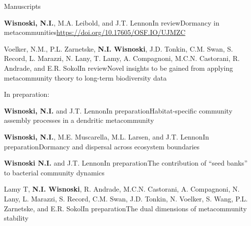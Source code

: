 \documentclass{resume} %
\begin{document}
\bigskip
\newpage

\begin{rhangSection}{Manuscripts}

\begin{Prep}{{\bf Wisnoski, N.I.}, M.A. Leibold, and J.T. Lennon}{In review}{Dormancy in metacommunities}{\url{https://doi.org/10.17605/OSF.IO/UJMZC}}
\end{Prep}

\begin{Prep}{Voelker, N.M., P.L. Zarnetske, {\bf N.I. Wisnoski}, J.D. Tonkin, C.M. Swan, S. Record, L. Marazzi, N. Lany, T. Lamy, A. Compagnoni, M.C.N. Castorani, R. Andrade, and E.R. Sokol}{In review}{Novel insights to be gained from applying metacommunity theory to long-term biodiversity data}{}
\end{Prep}

\smallskip
{ In preparation:}

\begin{Prep}{{\bf Wisnoski, N.I.} and J.T. Lennon}{In preparation}{Habitat-specific community assembly processes in a dendritic metacommunity}{}
\end{Prep}

\begin{Prep}{{\bf Wisnoski, N.I.}, M.E. Muscarella, M.L. Larsen, and J.T. Lennon}{In preparation}{Dormancy and dispersal across ecosystem boundaries}{}
\end{Prep}

\begin{Prep}{{\bf Wisnoski N.I.} and J.T. Lennon}{In preparation}{The contribution of \enquote{seed banks} to bacterial community dynamics}{}
\end{Prep}

\begin{Prep}{Lamy T, {\bf N.I. Wisnoski}, R. Andrade, M.C.N. Castorani, A. Compagnoni, N. Lany, L. Marazzi, S. Record, C.M. Swan, J.D. Tonkin, N. Voelker, S. Wang, P.L. Zarnetske, and E.R. Sokol}{In preparation}{The dual dimensions of metacommunity stability}{}
\end{Prep}

\end{rhangSection}

\bigskip

\end{document}
